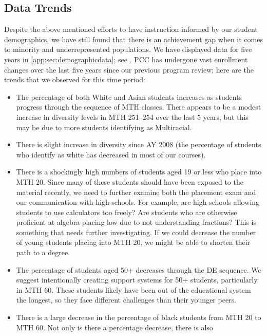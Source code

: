 \subsection{Data Trends}\label{needs:sec:trends}
Despite the above mentioned efforts to have instruction informed by our student
demographics, we have still found that there is an achievement gap when it
comes to minority and underrepresented populations. We have displayed data for
five years in \vref{app:sec:demographicdata}; see
. PCC has
undergone vast enrollment changes over the last five years since our previous
program review; here are the trends that we observed for this time period:
\begin{itemize}
    \item The percentage of both White and Asian students increases as students
      progress through the sequence of MTH classes. There appears to be a
      modest increase in diversity levels in MTH 251--254 over the last 5
      years, but this may be due to more students identifying as Multiracial.
    \item There is slight increase in diversity since AY 2008 (the percentage
      of students who identify as white has decreased in most of our courses).  
    \item There is a shockingly high numbers of students aged 19 or less who
      place into MTH 20. Since many of these students should have been exposed
      to the material recently, we need to further examine both the placement
      exam and our communication with high schools. For example, are high
      schools allowing students to use calculators too freely? Are students who
      are otherwise proficient at algebra placing low due to not understanding
      fractions? This is something that needs further investigating. If we
      could decrease the number of young students placing into MTH 20, we might
      be able to shorten their path to a degree.
    \item The percentage of students aged 50+ decreases through the DE
      sequence. We suggest intentionally creating support systems for 50+
      students, particularly in MTH 60. These students likely have been out of
      the educational system the longest, so they face different challenges
      than their younger peers.
    \item There is a large decrease in the percentage of black students from
      MTH 20 to MTH 60. Not only is there a percentage decrease, there is also

\end{itemize}
